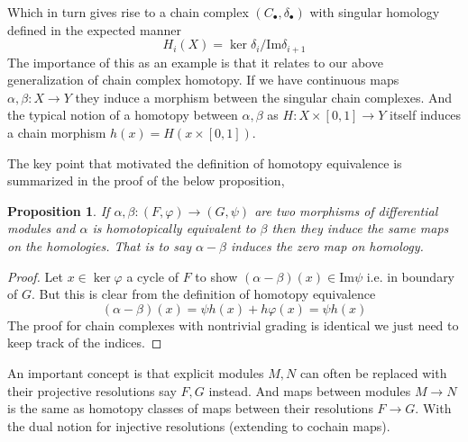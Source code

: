 \documentclass[12pt]{article}
\numberwithin{equation}{section}
\newcommand{\image}{{\mathrm{Im}}}
\newtheorem{proposition}{Proposition}[section]
\begin{document}
	Which in turn gives rise to a chain complex $(C_\bullet, \delta_\bullet)$ with singular homology defined in the expected manner \[ H_i(X)=\ker \delta_i/ \image \delta_{i+1	} \]
	The importance of this as an example is that it relates to our above generalization of chain complex homotopy. If we have continuous maps $\alpha ,\beta :X \to Y$ they induce a morphism between the singular chain complexes. And the typical notion of a homotopy between $\alpha, \beta $ as $H:X \times [0,1] \to Y $ itself induces a chain morphism $h(x)=H(x\times [0,1])$.
	
	The key point that motivated the definition of homotopy equivalence is summarized in the proof of the below proposition,
	\begin{proposition}
		If $\alpha, \beta: (F,\varphi) \to (G,\psi)$ are two morphisms of differential modules and $\alpha $ is homotopically equivalent to $\beta $ then they induce the same maps on the homologies. That is to say $\alpha- \beta $ induces the zero map on homology.
	\end{proposition}
	\begin{proof}
		Let $x \in \ker \varphi $ a cycle of $F$ to show $(\alpha - \beta) (x) \in \image \psi $ i.e. in boundary of $G$. But this is clear from the definition of homotopy equivalence 
		\[ (\alpha-\beta) (x)=\psi h (x) + h \varphi(x) = \psi h(x) \]
		The proof for chain complexes with nontrivial grading is identical we just need to keep track of the indices.
	\end{proof}
	
	An important concept is that explicit modules $M, N$ can often be replaced with their projective resolutions say $F,G$ instead. And maps between modules $M \to N$ is the same as homotopy classes of maps between their resolutions $F \to G$. With the dual notion for injective resolutions (extending to cochain maps).
	
\end{document}
